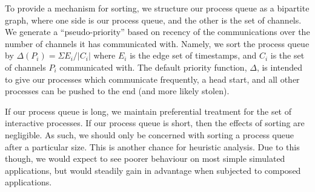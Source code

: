 To provide a mechanism for sorting, we structure our process queue as a bipartite 
graph, where one side is our process queue, and the other is the set of channels.
We generate a ``pseudo-priority'' based on recency of the communications over
the number of channels it has communicated with. Namely, we sort the process queue
by $\Delta(P_i) = \Sigma E_i / |C_i|$ where $E_i$ is the edge set of timestamps,
and $C_i$ is the set of channels $P_i$ communicated with. The default priority function, $\Delta$,
is intended to give our processes which communicate frequently, a head start, and
all other processes can be pushed to the end (and more likely stolen). 

If our process queue is long, we maintain preferential treatment for the set of 
interactive processes. If our process queue is short, then the effects of 
sorting are negligible. As such, we should only be concerned with sorting 
a process queue after a particular size. This is another chance for heuristic
analysis. Due to this though, we would expect to see poorer behaviour on most
simple simulated applications, but would steadily gain in advantage when 
subjected to composed applications.

